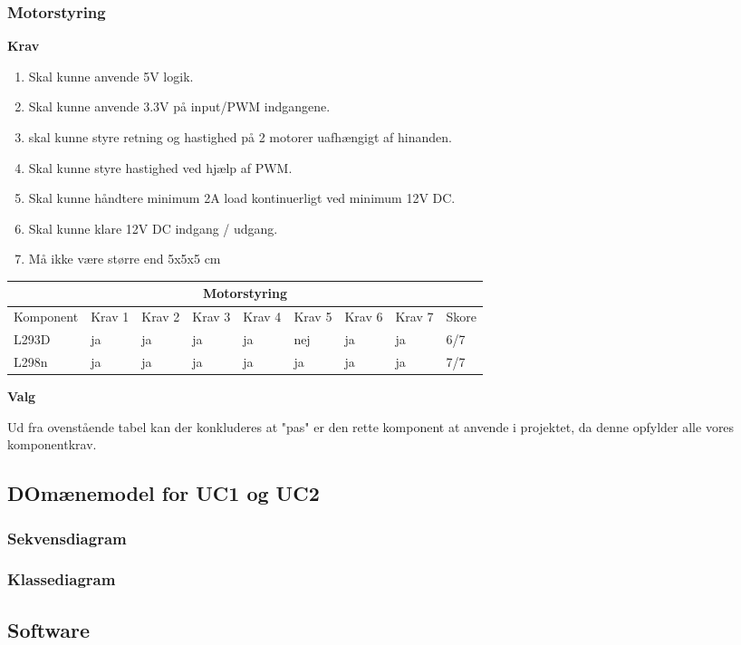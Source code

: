 \subsubsection{Motorstyring}
\textbf{Krav}
\begin{enumerate}
\item Skal kunne anvende 5V logik.
\item Skal kunne anvende 3.3V på input/PWM indgangene.
\item skal kunne styre retning og hastighed på 2 motorer uafhængigt af hinanden.
\item Skal kunne styre hastighed ved hjælp af PWM.
\item Skal kunne håndtere minimum 2A load kontinuerligt ved minimum 12V DC.
\item Skal kunne klare 12V DC indgang / udgang. 
\item Må ikke være større end 5x5x5 cm
\end{enumerate}
\begin{center}
\begin{tabular}{|p{2.1cm}||p{1.3cm}|p{1.3cm} |p{1.3cm} |p{1.3cm}|p{1.3cm}| p{1.3cm}| p{1.3cm}| p{1cm}|}
 \hline
 \multicolumn{9}{|c|}{Motorstyring} \\
 \hline
 Komponent & Krav 1 & Krav 2 & Krav 3 & Krav 4 & Krav 5  & Krav 6 & Krav 7 & Skore \\
 \hline
 L293D  & ja & ja & ja & ja & nej & ja & ja & 6/7\\
 L298n & ja & ja & ja & ja & ja & ja & ja & 7/7\\
 \hline
\end{tabular}
\end{center}
\textbf{Valg}

Ud fra ovenstående tabel kan der konkluderes at "pas" er den rette komponent at anvende i projektet, da denne opfylder alle vores komponentkrav.  

\subsection{DOmænemodel for UC1 og UC2}

\subsubsection{Sekvensdiagram}
\subsubsection{Klassediagram}

\subsection{Software}
